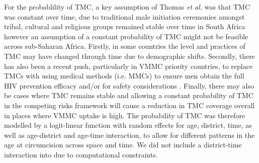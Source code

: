 \documentclass{article}
\begin{document}
For the probablility of TMC, a key assumption of Thomas {\it et al.} \cite{thomas2024substantial} was that TMC was constant over time, due to traditional male initiation ceremonies amongst tribal, cultural and religious groups remained stable over time in South Africa however an assumption of a constant probability of TMC might not be feasible across sub-Saharan Africa. Firstly, in some countries the level and practices of TMC may have changed through time due to demographic shifts. Secondly, there has also been a recent push, particularly in VMMC priority countries, to replace TMCs with using medical methods (i.e. MMCs) to ensure men obtain the full HIV prevention efficacy and/or for safety considerations \cite{thomas2024substantial}. Finally, there may also be cases where TMC remains stable and allowing a constant probability of TMC in the competing risks framework will cause a reduction in TMC coverage overall in places where VMMC uptake is high. The probability of TMC was therefore modelled by a logit-linear function with random effects for age, district, time, as well as age-district and age-time interaction, to allow for different patterns in the age at circumcision across space and time. We did not include a district-time interaction into due to computational constraints. 
\end{document}
